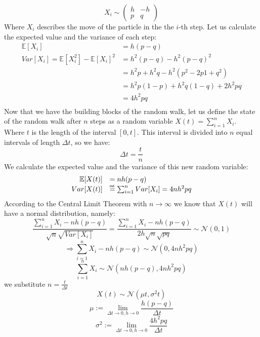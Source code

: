 \documentclass[times, utf8, diplomski]{fer}
\begin{document}
\begin{equation}
X_i \sim \left( \begin{array}{cc} h & -h \\
					p & q \end{array} \right)
\end{equation}
Where $X_i$ describes the move of the particle in the the $i$-th step.
Let us calculate the expected value and the variance of each step:
\begin{equation}
	\begin{array}{rl}
									\mathbb{E}[X_i] &= h(p-q) \\
		Var[X_i] = \mathbb{E}[X_i^2] - \mathbb{E}[X_i]^2 &= h^2(p-q) - h^2(p-q)^2 \\
										&= h^2p + h^2q - h^2(p^2 - 2p1 + q^2)\\
										&= h^2p(1-p) + h^2q(1-q) + 2h^2pq\\
										&= 4h^2pq \\
	\end{array}
\end{equation}
Now that we have the building blocks of the random walk, let us define the state of the random walk after $n$ steps as a random variable $X(t) = \sum_{i=1}^n X_i$. Where $t$ is the length of the interval $[0,t]$. This interval is divided into $n$ equal intervals of length $\Delta t$, so we have:
\begin{equation}
	\Delta t = \frac{t}{n}
\end{equation}
We calculate the expected value and the variance of this new random variable:
\begin{equation}
	\begin{array}{rl}
		\mathbb{E}[X(t)] &= nh(p-q) \\
		Var[X(t)] &\indeq \sum_{i=1}^n Var[X_i] = 4nh^2pq \\
	\end{array}
\end{equation}
According to the Central Limit Theorem with $n \rightarrow \infty$ we know that $X(t)$ will have a normal distribution, namely:
$$ \frac{\sum_{i=1}^n X_i - nh(p-q)}{\sqrt{n}\sqrt{Var[X_i]}} = \frac{\sum_{i=1}^n X_i - nh(p-q)}{2h\sqrt{n}\sqrt{pq}} \sim \mathcal{N}(0,1) $$
$$ \Rightarrow \sum_{i=1}^n X_i - nh(p-q) \sim \mathcal{N}(0,4nh^2pq)$$
\begin{equation}
	\sum_{i=1}^n X_i \sim \mathcal{N}(nh(p-q), 4nh^2pq)
\end{equation}
we substitute $n=\frac{t}{\Delta t}$
\begin{equation}
	X(t) \sim \mathcal{N}(\mu t, \sigma^2t)
\end{equation}
\begin{equation}
	\mu := \lim_{\Delta t \to 0, h \to 0} \frac{h(p-q)}{\Delta t}
\end{equation}
\begin{equation}
	\sigma^2 := \lim_{\Delta t \to 0, h \to 0} \frac{4h^2pq}{\Delta t}
\end{equation}
\end{document}
